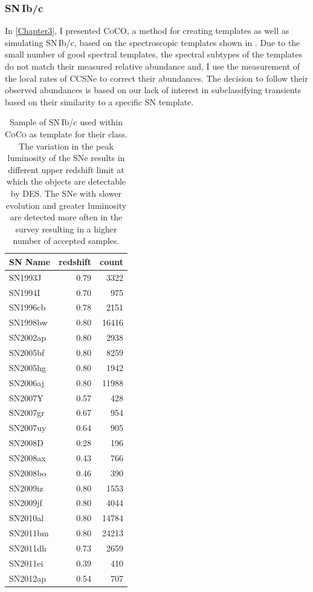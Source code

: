 \subsubsection{SN\,Ib/c}
In \cref{Chapter3}, I presented \textsc{CoCO}, a method for creating templates as well as simulating SN\,Ib/c, based on the spectroscopic templates shown in . Due to the small number of good spectral templates, the spectral subtypes of the templates do not match their measured relative abundance and, I use the \citet{Li2010} measurement of the local rates of CCSNe to correct their abundances. The decision to follow their observed abundances is based on our lack of interest in subclassifying transients based on their similarity to a specific SN template.

\begin{table}
  \caption{Sample of SN\,Ib/c used within \textsc{CoCo} as template for their class. The variation in the peak luminosity of the SNe results in different upper redshift limit at which the objects are detectable by DES. The SNe with slower evolution and greater luminosity are detected more often in the survey resulting in a higher number of accepted samples.}
  \label{tab:IbcTemplates}
  \centering
  \begin{tabular}{|l|r|r|}
    \hline
    SN Name  & redshift & count \\
    \hline
    SN1993J  & 0.79 &  3322  \\
    SN1994I  & 0.70 &   975  \\
    SN1996cb & 0.78 &  2151  \\
    SN1998bw & 0.80 & 16416  \\
    SN2002ap & 0.80 &  2938  \\
    SN2005bf & 0.80 &  8259  \\
    SN2005hg & 0.80 &  1942  \\
    SN2006aj & 0.80 & 11988  \\
    SN2007Y  & 0.57 &   428  \\
    SN2007gr & 0.67 &   954  \\
    SN2007uy & 0.64 &   905  \\
    SN2008D  & 0.28 &   196  \\
    SN2008ax & 0.43 &   766  \\
    SN2008bo & 0.46 &   390  \\
    SN2009iz & 0.80 &  1553  \\
    SN2009jf & 0.80 &  4044  \\
    SN2010al & 0.80 & 14784  \\
    SN2011bm & 0.80 & 24213  \\
    SN2011dh & 0.73 &  2659  \\
    SN2011ei & 0.39 &   410  \\
    SN2012ap & 0.54 &   707 \\
    \hline
  \end{tabular}
\end{table}


